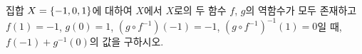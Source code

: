 집합 $X=\{-1{,}\mkern3mu\mathopen{}0{,}\mkern3mu\mathopen{}1\}$에 대하여 $X$에서 $X$로의 두 함수 $f$, $g$의 역함수가 모두 존재하고 $f(1)=-1$, $g(0)=1$, $(g\circ f^{-1})(-1)=-1$, $(g\circ f^{-1})^{-1}(1)=0$일 때, $f(-1)+g^{-1}(0)$의 값을 구하시오.
